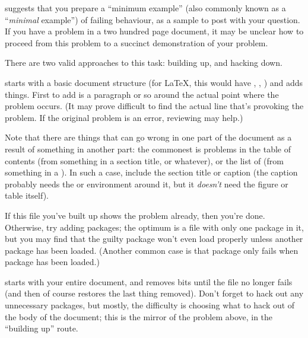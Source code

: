 
suggests that you prepare a ``minimum example'' (also commonly known
as a ``\emph{minimal} example'') of failing behaviour,
as a sample to post with your question.  If you have a problem in a
two hundred page document, it may be unclear how to proceed from this
problem to a succinct demonstration of your problem.

There are two valid approaches to this task: building up, and hacking
down.

 starts
with a basic document structure
(for \LaTeX{}, this would have ,
, ) and adds
things.  First to add is a paragraph or so around the actual point
where the problem occurs.  (It may prove difficult to find the actual
line that's provoking the problem.  If the original problem is an
error, reviewing %
may help.)

Note that there are things that can go wrong in one part of the
document as a result of something in another part: the commonest is
problems in the table of contents (from something in a section title,
or whatever), or the list of  (from something in a
).  In such a case, include the section title or caption
(the caption probably needs the  or
 environment around it, but it \emph{doesn't} need
the figure or table itself).

If this file you've built up shows the problem already, then you're done.
Otherwise, try adding packages; the optimum is a file with only one
package in it, but you may find that the guilty package won't even load
properly unless another package has been loaded.  (Another common case
is that package  only fails when package  has been
loaded.)

 starts
with your entire document, and
removes bits until the file no longer fails (and then of course
restores the last thing removed).  Don't forget to hack out any
unnecessary packages, but mostly, the difficulty is choosing what to
hack out of the body of the document; this is the mirror of the
problem above, in the ``building up'' route.

